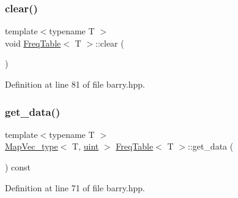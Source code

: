 \mbox{\label{classbarry_1_1_freq_table_a326660096e4309780aea8355d0f74ac7}} 
\subsubsection{\texorpdfstring{clear()}{clear()}}
{\footnotesize\ttfamily template$<$typename T $>$ \\
void \hyperlink{classbarry_1_1_freq_table}{Freq\+Table}$<$ T $>$\+::clear (\begin{DoxyParamCaption}{ }\end{DoxyParamCaption})\hspace{0.3cm}{\ttfamily [inline]}}



Definition at line 81 of file barry.\+hpp.

\mbox{\label{classbarry_1_1_freq_table_a7b99496d1c2f4193654752856b30d1a5}} 
\subsubsection{\texorpdfstring{get\+\_\+data()}{get\_data()}}
{\footnotesize\ttfamily template$<$typename T $>$ \\
\hyperlink{namespacebarry_a2f0d3aab1d67e4c8eaeab9022e16139f}{Map\+Vec\+\_\+type}$<$ T, \hyperlink{namespacebarry_a11dfc53ddb4672278319aa04f1e09a6c}{uint} $>$ \hyperlink{classbarry_1_1_freq_table}{Freq\+Table}$<$ T $>$\+::get\+\_\+data (\begin{DoxyParamCaption}{ }\end{DoxyParamCaption}) const\hspace{0.3cm}{\ttfamily [inline]}}



Definition at line 71 of file barry.\+hpp.

\mbox{\label{classbarry_1_1_freq_table_ab5dd6677f52072c93d18b2b9a3369ae7}} 
